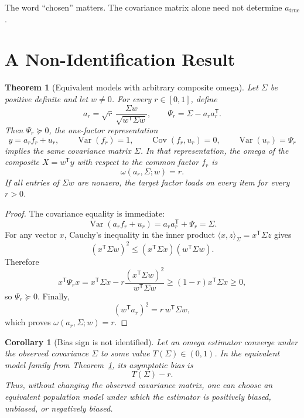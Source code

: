 \documentclass[11pt]{article}
\newcommand{\Var}{\operatorname{Var}}
\newcommand{\Cov}{\operatorname{Cov}}
\newcommand{\T}{^{\mathsf T}}
\theoremstyle{plain}
\newtheorem{theorem}{Theorem}
\newtheorem{corollary}{Corollary}
\theoremstyle{remark}
\begin{document}
The word ``chosen'' matters. The covariance matrix alone need not determine
\(a_{\mathrm{true}}\).

\section{A Non-Identification Result}

\begin{theorem}[Equivalent models with arbitrary composite omega]
\label{thm:anyomega}
Let \(\Sigma\) be positive definite and let \(w\ne 0\). For every
\(r\in[0,1]\), define
\begin{equation}\label{eq:ar}
  a_r
  =
  \sqrt{r}\,
  \frac{\Sigma w}{\sqrt{w\T\Sigma w}},
  \qquad
  \Psi_r
  =
  \Sigma-a_r a_r\T .
\end{equation}
Then \(\Psi_r\succeq0\), the one-factor representation
\[
  y=a_r f_r+u_r,\qquad
  \Var(f_r)=1,\qquad
  \Cov(f_r,u_r)=0,\qquad
  \Var(u_r)=\Psi_r
\]
implies the same covariance matrix \(\Sigma\). In that representation, the omega
of the composite \(X=w\T y\) with respect to the common factor \(f_r\) is
\[
  \omega(a_r,\Sigma;w)=r .
\]
If all entries of \(\Sigma w\) are nonzero, the target factor loads on every
item for every \(r>0\).
\end{theorem}

\begin{proof}
The covariance equality is immediate:
\[
  \Var(a_r f_r+u_r)=a_r a_r\T+\Psi_r=\Sigma .
\]
For any vector \(x\), Cauchy's inequality in the inner product
\(\langle x,z\rangle_\Sigma=x\T\Sigma z\) gives
\[
  (x\T\Sigma w)^2
  \le
  (x\T\Sigma x)(w\T\Sigma w).
\]
Therefore
\[
  x\T\Psi_r x
  =
  x\T\Sigma x
  -
  r\frac{(x\T\Sigma w)^2}{w\T\Sigma w}
  \ge
  (1-r)x\T\Sigma x
  \ge 0 ,
\]
so \(\Psi_r\succeq0\). Finally,
\[
  (w\T a_r)^2
  =
  r\,w\T\Sigma w ,
\]
which proves \(\omega(a_r,\Sigma;w)=r\).
\end{proof}

\begin{corollary}[Bias sign is not identified]
\label{cor:bias}
Let an omega estimator converge under the observed covariance \(\Sigma\) to
some value \(T(\Sigma)\in(0,1)\). In the equivalent model family from
Theorem~\ref{thm:anyomega}, its asymptotic bias is
\[
  T(\Sigma)-r .
\]
Thus, without changing the observed covariance matrix, one can choose an
equivalent population model under which the estimator is positively biased,
unbiased, or negatively biased.
\end{corollary}
\end{document}
